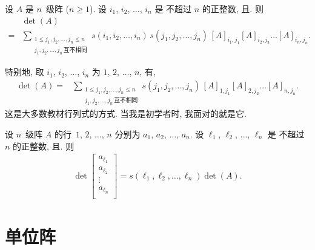\documentclass[%
    UTF8,%
    fontset=none,%
    punct=kaiming,%
    zihao=-4,%
    a4paper,%
    oneside,%
]{ctexbook}
\let\emph\relax
\renewcommand*{\leq}{\leqslant}
\renewcommand*{\geq}{\geqslant}
\begin{document}
\begin{theorem}
    设 \(A\) 是 \(n\)~级阵 (\(n \geq 1\)).
    设 \(i_1\), \(i_2\), \(\dots\), \(i_n\) 是%
    不超过 \(n\) 的正整数,
    且\emph{互不相同}.
    则
    \begin{align*}
             & \det {(A)}                  \\
        = {} &
        \sum_{\substack{
        1 \leq j_1, j_2, \dots, j_n \leq n \\
                j_1, j_2, \dots, j_n\,\text{互不相同}
            }}
        {s(i_1, i_2, \dots, i_n)\,
            s(j_1, j_2, \dots, j_n)\,
            [A]_{i_1,j_1} [A]_{i_2,j_2} \dots [A]_{i_n,j_n}}.
    \end{align*}
\end{theorem}

特别地, 取
\(i_1\), \(i_2\), \(\dots\), \(i_n\)
为
\(1\), \(2\), \(\dots\), \(n\),
有,
\begin{align*}
    \det {(A)}
    = {} &
    \sum_{\substack{
    1 \leq j_1, j_2, \dots, j_n \leq n \\
            j_1, j_2, \dots, j_n\,\text{互不相同}
        }}
    { s(j_1, j_2, \dots, j_n)\,
        [A]_{1,j_1} [A]_{2,j_2} \dots [A]_{n,j_n}}.
\end{align*}
这是大多数教材\emph{定义}行列式的方式.
当我是初学者时, 我面对的就是它.

\begin{theorem}
    设 \(n\)~级阵 \(A\) 的行~\(1\), \(2\), \(\dots\), \(n\)
    分别为 \(a_1\), \(a_2\), \(\dots\), \(a_n\).
    设 \(\ell_1\), \(\ell_2\), \(\dots\), \(\ell_n\) 是%
    不超过 \(n\) 的正整数,
    且\emph{互不相同}.
    则
    \begin{align*}
        \det {\begin{bmatrix}
                      a_{\ell_1} \\
                      a_{\ell_2} \\
                      \vdots     \\
                      a_{\ell_n} \\
                  \end{bmatrix}
        }
        = s(\ell_1, \ell_2, \dots, \ell_n) \det {(A)}.
    \end{align*}
\end{theorem}

\section{单位阵}
\end{document}
